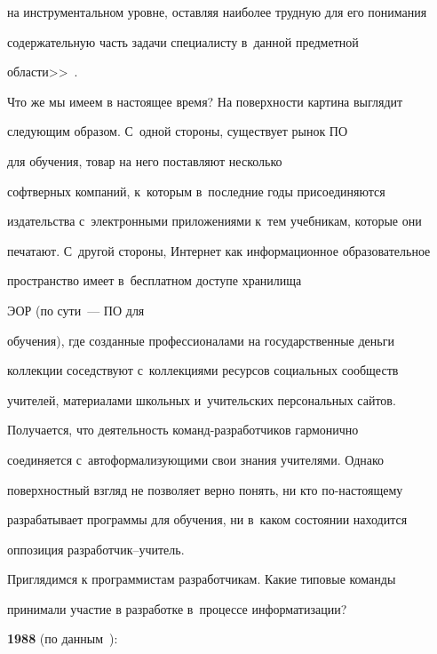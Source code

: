 на инструментальном уровне, оставляя наиболее трудную для его понимания

содержательную часть задачи специалисту в~данной предметной

  об\-ласти>>~\cite[с.~99]{12-vik}.



  Что же мы имеем в настоящее время? На поверхности картина выглядит

следующим образом. С~одной стороны, существует рынок ПО

 для обучения, товар на него поставляют несколько

софтверных компаний, к~которым в~последние годы присоединяются

издательства с~электронными приложениями к~тем учебникам, которые они

печатают. С~другой стороны, Интернет как информационное образовательное

пространство имеет в~бесплатном доступе хранилища

ЭОР (по сути~--- ПО для

обучения), где созданные профессионалами на государственные деньги

коллекции соседствуют с~коллекциями ресурсов социальных сообществ

учителей, материалами школьных и~учительских персональных сайтов.

Получается, что деятельность ко\-манд-раз\-ра\-бот\-чи\-ков гармонично

соединяется с~автоформализующими свои знания учителями. Однако

поверхностный взгляд не позволяет верно понять, ни кто по-на\-сто\-яще\-му

разрабатывает программы для обучения, ни в~каком состоянии находится

оппозиция раз\-ра\-бот\-чик--учи\-тель.



  Приглядимся к программистам разработчикам. Какие типовые команды

принимали участие в разработке в~процессе информатизации?



\smallskip



  \textbf{1988} (по данным~\cite{13-vik}):

